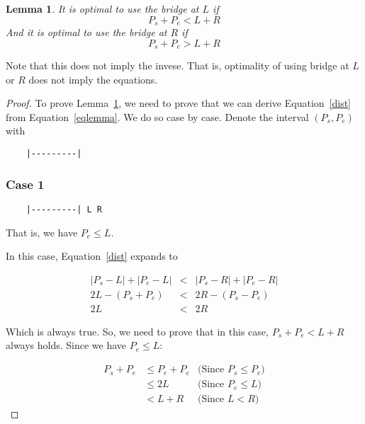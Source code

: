 \documentclass[a4paper]{article}
\newtheorem{lemma}{Lemma}[subsection]
\begin{document}
\begin{lemma}
    \label{lem}
    It is optimal to use the bridge at $L$ if
    \begin{equation}
    \label{eqlemma}
    P_s + P_e < L+R
    \end{equation}
    And it is optimal to use the bridge at $R$ if
    \begin{equation}
    \label{eqlemma}
    P_s + P_e > L+R
    \end{equation}
\end{lemma}

Note that this does not imply the invese. That is, optimality of using bridge
at $L$ or $R$ does not imply the equations.

\begin{proof}

    To prove Lemma~\ref{lem}, we need to prove that we can derive
    Equation~\ref{dist} from Equation~\ref{eqlemma}. We do so case by case.
    Denote the interval $(P_s, P_e)$ with

    \begin{verbatim}
    |---------|
    \end{verbatim}

    \subsubsection*{Case 1}

    \begin{verbatim}
    |---------| L R
    \end{verbatim}

    That is, we have $P_e \le L$.

    In this case, Equation~\ref{dist} expands to

    \begin{eqnarray*}
        |P_s - L| + |P_e - L| &<& |P_s - R| + |P_e - R| \\
        2L - (P_s + P_e) &<& 2R - (P_s - P_e) \\
        2L &<& 2R
    \end{eqnarray*}

    Which is always true. So, we need to prove that in this case,
    $P_s + P_e < L+R$ always holds. Since we have $P_e \le L$:

    \begin{eqnarray*}
        P_s + P_e &\le P_e + P_e & \text{(Since $P_s \le P_e$)} \\
        &\le 2L & \text{(Since $P_e \le L$)} \\
        &< L + R & \text{(Since $L < R$)}
    \end{eqnarray*}


\end{proof}
\end{document}
